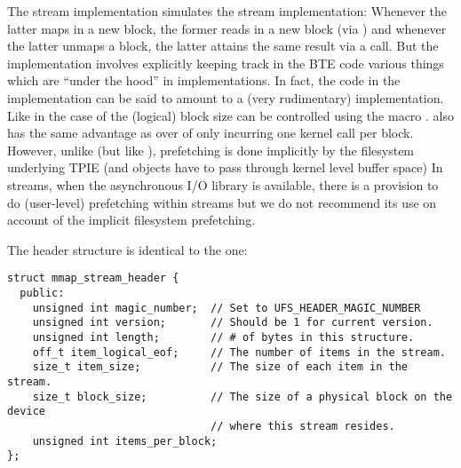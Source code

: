 The  stream implementation simulates the 
stream implementation: Whenever the latter maps in a new block, the former
reads in a new block (via ) and whenever the latter unmaps a
block, the latter attains the same result via a  call. But
the  implementation involves explicitly keeping track in the
BTE code various things which are ``under the hood'' in 
implementations. In fact, the code in the
 implementation can be said to amount to a (very rudimentary)
 implementation. Like in the case of  the
(logical) block size can be controlled using the macro
.  also has the same
advantage as  over  of only incurring one
kernel call per block. However, unlike  (but like
), prefetching is done implicitly by the filesystem
underlying TPIE (and objects have to pass through kernel level buffer
space)
In  streams, when the asynchronous I/O library
 is available,
there is a provision to do (user-level) prefetching within 
streams but we do not recommend its use on account of the implicit
filesystem prefetching.

The  header structure is identical to the  one:
\begin{verbatim}
struct mmap_stream_header { 
  public:
    unsigned int magic_number;  // Set to UFS_HEADER_MAGIC_NUMBER
    unsigned int version;       // Should be 1 for current version.
    unsigned int length;        // # of bytes in this structure.
    off_t item_logical_eof;     // The number of items in the stream.
    size_t item_size;           // The size of each item in the stream.
    size_t block_size;          // The size of a physical block on the device
                                // where this stream resides.
    unsigned int items_per_block;
};
\end{verbatim}

